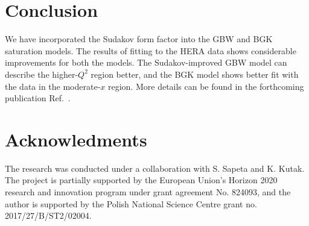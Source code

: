 \documentclass{appolb}
\begin{document}
\section{Conclusion}
We have incorporated the Sudakov form factor into the GBW and BGK saturation models. The results of fitting to the HERA data shows considerable improvements for both the models. The Sudakov-improved GBW model can describe the higher-$Q^2$ region better, and the BGK model shows better fit with the data in the moderate-$x$ region. More details can be found in the forthcoming publication Ref.~\cite{Goda:2022wsc}.\\
\section*{Acknowledments}
The research was conducted under a collaboration with S. Sapeta and K. Kutak. The project is partially supported by the European Union’s Horizon 2020 research and innovation program under grant agreement No. 824093, and the author is supported by the Polish National Science Centre grant no. 2017/27/B/ST2/02004.
\printbibliography
\end{document}

